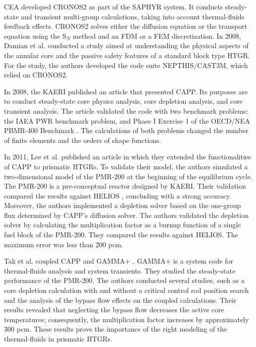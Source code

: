 \gls{CEA} developed CRONOS2 \cite{lautard_cronos_1990} as part of the SAPHYR system.
It conducts steady-state and transient multi-group calculations, taking into account thermal-fluids feedback effects.
CRONOS2 solves either the diffusion equation or the transport equation using the S$_N$ method and an \gls{FDM} or a \gls{FEM} discretization.
In 2008, Damian et al. \cite{damian_vhtr_2008} conducted a study aimed at understanding the physical aspects of the annular core and the passive safety features of a standard block type \gls{HTGR}.
For the study, the authors developed the code suite NEPTHIS/CAST3M, which relied on CRONOS2.

In 2008, the \gls{KAERI} published an article \cite{lee_development_2008} that presented CAPP.
Its purposes are to conduct steady-state core physics analysis, core depletion analysis, and core transient analysis.
The article validated the code with two benchmark problems: the IAEA PWR benchmark problem, and Phase I Exercise 1 of the OECD/NEA PBMR-400 Benchmark \cite{reitsma_oecd-neansc_2008}.
The calculations of both problems changed the number of finite elements and the orders of shape functions.

In 2011, Lee et al. published an article \cite{lee_development_2011} in which they extended the functionalities of CAPP to prismatic \glspl{HTGR}.
To validate their model, the authors simulated a two-dimensional model of the PMR-200 at the beginning of the equilibrium cycle.
The PMR-200 is a pre-conceptual reactor designed by \gls{KAERI}.
Their validation compared the results against HELIOS \cite{stammler_helios_1998}, concluding with a strong accuracy.
Moreover, the authors implemented a depletion solver based on the one-group flux determined by CAPP's diffusion solver.
The authors validated the depletion solver by calculating the multiplication factor as a burnup function of a single fuel block of the PMR-200.
They compared the results against HELIOS.
The maximum error was less than 200 pcm.

Tak et al. \cite{tak_cappgamma_2016} coupled CAPP and GAMMA+ \cite{lim_gamma_2006}.
GAMMA+ is a system code for thermal-fluids analysis and system transients.
They studied the steady-state performance of the PMR-200.
The authors conducted several studies, such as a core depletion calculation with and without a critical control rod position search and the analysis of the bypass flow effects on the coupled calculations.
Their results revealed that neglecting the bypass flow decreases the active core temperatures; consequently, the multiplication factor increases by approximately 300 pcm.
These results prove the importance of the right modeling of the thermal-fluids in prismatic HTGRs.

